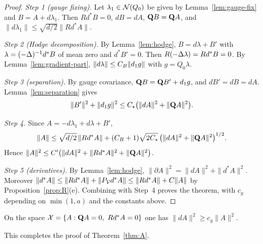 \begin{proof}
\emph{Step 1 (gauge fixing).} Let $\lambda_1\in\mathcal N(Q_0)$ be given by Lemma~\ref{lem:gauge-fix} and $B=A+d\lambda_1$. Then $Rd^*B=0$, $dB=dA$, $\mathbf Q B=\mathbf Q A$, and $\|d\lambda_1\|\le\sqrt{d/2}\|Rd^*A\|$.

\emph{Step 2 (Hodge decomposition).} By Lemma~\ref{lem:hodge}, $B=d\lambda+B'$ with $\lambda=(-\Delta)^{-1}d^*B$ of mean zero and $d^*B'=0$. Then $R(-\Delta\lambda)=Rd^*B=0$. By Lemma~\ref{lem:gradient-part}, $\|d\lambda\|\le C_B\|d_1 g\|$ with $g=Q_0\lambda$.

\emph{Step 3 (separation).} By gauge covariance, $\mathbf Q B=\mathbf Q B'+d_1 g$, and $dB'=dB=dA$. Lemma~\ref{lem:separation} gives
\[
\|B'\|^2+\|d_1 g\|^2\le C_\star\big(\|dA\|^2+\|\mathbf Q A\|^2\big).
\]

\emph{Step 4.} Since $A=-d\lambda_1+d\lambda+B'$,
\[
\|A\|\le\sqrt{d/2}\,\|Rd^*A\|+(C_B+1)\sqrt{2C_\star}\,\big(\|dA\|^2+\|\mathbf Q A\|^2\big)^{1/2}.
\]
Hence $\|A\|^2\le C'\big(\|dA\|^2+\|Rd^*A\|^2+\|\mathbf Q A\|^2\big)$.

\emph{Step 5 (derivatives).} By Lemma~\ref{lem:hodge}, $\|\partial A\|^2=\|dA\|^2+\|d^*A\|^2$. Moreover $\|d^*A\|\le\|Rd^*A\|+\|P_\mathcal V d^*A\|\le\|Rd^*A\|+C\|A\|$ by Proposition~\ref{prop:R}(e). Combining with Step~4 proves the theorem, with $c_g$ depending on $\min(1,a)$ and the constants above.
\end{proof}

\begin{corollary}\label{cor:X-positive}
On the space $\mathcal X=\{A:\mathbf Q A=0,\ Rd^*A=0\}$ one has $\|dA\|^2\ge c_g\|A\|^2$.
\end{corollary}

This completes the proof of Theorem~\ref{thm:A}.
